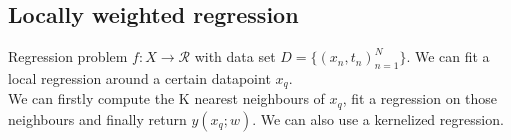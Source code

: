 \subsection{Locally weighted regression}
Regression problem $f: X \xrightarrow{}\mathcal{R}$ with data set  $D = \{(x_{n}, t_{n})^{N}_{n=1}\}$. We can fit a local regression around a certain datapoint $x_{q}$.\\
We can firstly compute the K nearest neighbours of $x_{q}$, fit a regression on those neighbours and finally return $y(x_{q}; w)$. We can also use a kernelized regression.

